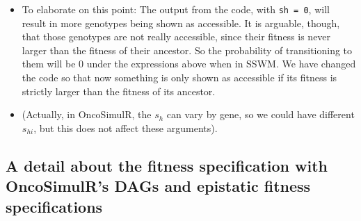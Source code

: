 \documentclass[11pt]{article}
\begin{document}
\begin{itemize}
\item To elaborate on this point: The output from the code, with \texttt{sh = 0}, will result in more genotypes being shown as accessible. It is arguable, though, that those genotypes are not really accessible, since their fitness is never larger than the fitness of their ancestor. So the probability of transitioning to them will be 0 under the expressions above when in SSWM. We have changed the code so that now something is only shown as accessible if its fitness is strictly larger than the fitness of its ancestor.

\item (Actually, in OncoSimulR, the \(s_h\) can vary by gene, so we could have different \(s_{hi}\), but this does not affect these arguments).
\end{itemize}


\subsection{A detail about the fitness specification with OncoSimulR's DAGs and epistatic fitness specifications}
\label{sec:orgcea5033}
\end{document}
